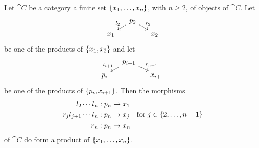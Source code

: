 \begin{proposition}\label{proposition:FiniteProdLeftCons}
Let \(\cat C\) be a category a finite set \(\left\{x_1, \dots{}, x_n\right\}\), with \(n \ge 2\), of objects of \(\cat C\). Let
\[\begin{tikzcd}[row sep=tiny, column sep=small]
& p_2 \ar["{l_2}", dl, swap] \ar["{r_2}", dr] \\
x_1 & & x_2 \end{tikzcd}\]
be one of the products of \(\left\{x_1, x_2\right\}\) and let
\[\begin{tikzcd}[row sep=tiny, column sep=small]
& p_{i+1} \ar["{l_{i+1}}", dl, swap] \ar["{r_{n+1}}", dr] \\
p_i & & x_{i+1}
\end{tikzcd}\]
be one of the products of \(\left\{p_i, x_{i+1}\right\}\).
%
%
Then the morphisms
\[\begin{aligned}
l_2 \cdots{} l_n &: p_n \to x_1 \\
r_j l_{j+1} \cdots{} l_n &: p_n \to x_j \quad \text{for } j \in \left\{2, \dots{}, n-1\right\} \\
r_n &: p_n \to x_n
\end{aligned}\]
of \(\cat C\) do form a product of \(\left\{x_1, \dots{}, x_n\right\}\).
\end{proposition}

